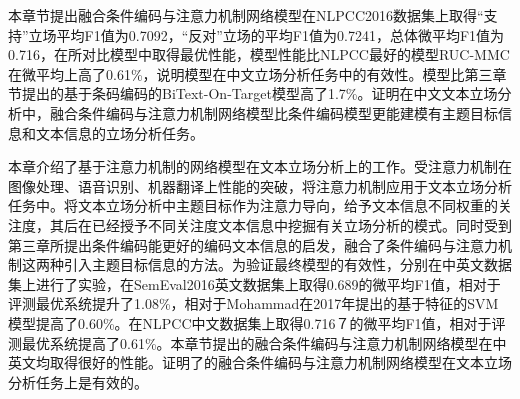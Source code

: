 本章节提出融合条件编码与注意力机制网络模型在NLPCC2016数据集上取得“支持”立场平均F1值为0.7092，“反对”立场的平均F1值为0.7241，总体微平均F1值为0.716，在所对比模型中取得最优性能，模型性能比NLPCC最好的模型RUC-MMC在微平均上高了0.61\%，说明模型在中文立场分析任务中的有效性。模型比第三章节提出的基于条码编码的BiText-On-Target模型高了1.7\%。证明在中文文本立场分析中，融合条件编码与注意力机制网络模型比条件编码模型更能建模有主题目标信息和文本信息的立场分析任务。



本章介绍了基于注意力机制的网络模型在文本立场分析上的工作。受注意力机制在图像处理、语音识别、机器翻译上性能的突破，将注意力机制应用于文本立场分析任务中。将文本立场分析中主题目标作为注意力导向，给予文本信息不同权重的关注度，其后在已经授予不同关注度文本信息中挖掘有关立场分析的模式。同时受到第三章所提出条件编码能更好的编码文本信息的启发，融合了条件编码与注意力机制这两种引入主题目标信息的方法。为验证最终模型的有效性，分别在中英文数据集上进行了实验，在SemEval2016英文数据集上取得0.689的微平均F1值，相对于评测最优系统提升了1.08\%，相对于Mohammad在2017年提出的基于特征的SVM模型提高了0.60\%。在NLPCC中文数据集上取得0.716７的微平均F1值，相对于评测最优系统提高了0.61\%。本章节提出的融合条件编码与注意力机制网络模型在中英文均取得很好的性能。证明了的融合条件编码与注意力机制网络模型在文本立场分析任务上是有效的。



